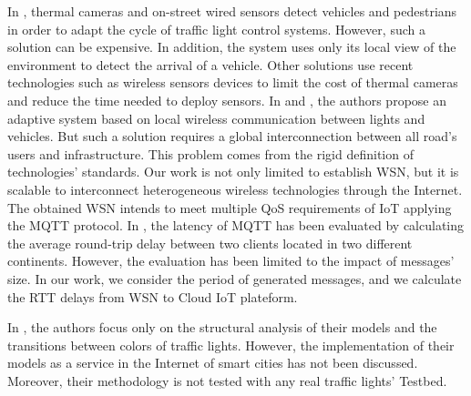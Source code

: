 In \cite{Web0}, thermal cameras and on-street wired sensors detect vehicles and pedestrians in order to adapt the cycle of traffic light control systems.
However, such a solution can be expensive. In addition, the system uses only its local view of the environment to detect the arrival of a vehicle. Other solutions use recent technologies such as wireless sensors devices to limit the cost of thermal cameras and reduce the time needed to deploy sensors.
In \cite{tlig_decentralized_2014} and \cite{rose_internet_2015}, the authors propose an adaptive system based on local wireless communication between lights and vehicles. But such a solution requires a global interconnection between all road's users and infrastructure. This problem comes from the rigid definition of technologies' standards. Our work is not only limited to establish WSN, but it is scalable to interconnect heterogeneous wireless technologies through the Internet. The obtained WSN intends to meet multiple QoS requirements of IoT applying the MQTT protocol. In \cite{Silva2018}, the latency of MQTT has been evaluated by calculating the average round-trip delay between two clients located in two different continents. However, the evaluation has been limited to the impact of messages' size. In our work, we consider the period of generated messages, and we calculate the RTT delays from WSN to Cloud IoT plateform.



In \cite{huang_modular_2014} \cite{difebbraro_trafficresponsive_2006} \cite{febbraro_using_2009} \cite{dossantossoares_modular_2012}, the authors focus only on the structural analysis of their models and the transitions between colors of traffic lights. However, the implementation of their models as a service in the Internet of smart cities has not been discussed. Moreover, their methodology is not tested with any real traffic lights' Testbed.




